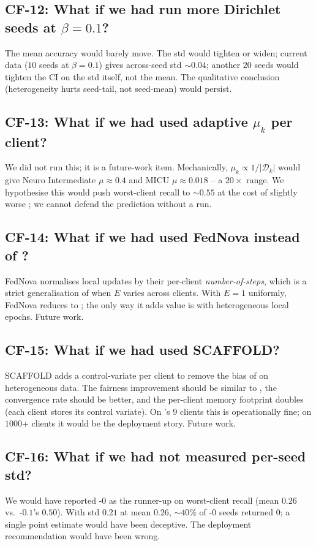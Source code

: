 \subsection{CF-12: What if we had run more Dirichlet seeds at $\beta=0.1$?}
The mean accuracy would barely move. The std would tighten or
widen; current data ($10$ seeds at $\beta\!=\!0.1$) gives across-seed
std $\sim$$0.04$; another $20$ seeds would tighten the CI on the std
itself, not the mean. The qualitative conclusion (heterogeneity
hurts seed-tail, not seed-mean) would persist.

\subsection{CF-13: What if we had used adaptive $\mu_k$ per client?}
We did not run this; it is a future-work item. Mechanically,
$\mu_k \!\propto\! 1/|\mathcal{D}_k|$ would give Neuro Intermediate
$\mu \!\approx\! 0.4$ and MICU $\mu \!\approx\! 0.018$ -- a $20\!\times$
range. We hypothesise this would push worst-client recall to
$\sim$$0.55$ at the cost of slightly worse \auroc{}; we cannot defend
the prediction without a run.

\subsection{CF-14: What if we had used FedNova instead of \fedprox{}?}
FedNova normalises local updates by their per-client
\emph{number-of-steps}, which is a strict generalisation of
\fedprox{} when $E$ varies across clients. With $E\!=\!1$ uniformly,
FedNova reduces to \fedavg{}; the only way it adds value is with
heterogeneous local epochs. Future work.

\subsection{CF-15: What if we had used SCAFFOLD?}
SCAFFOLD adds a control-variate per client to remove the bias of
\fedavg{} on heterogeneous data. The fairness improvement should be
similar to \fedprox{}, the convergence rate should be better, and
the per-client memory footprint doubles (each client stores its
control variate). On \mimic{}'s $9$ clients this is operationally
fine; on $1000$+ clients it would be the deployment story. Future
work.

\subsection{CF-16: What if we had not measured per-seed std?}
We would have reported \cvar{}-$0$ as the runner-up on worst-client
recall (mean $0.26$ vs.\ \fedprox{}-$0.1$'s $0.50$). With std
$0.21$ at mean $0.26$, $\sim$$40\%$ of \cvar{}-$0$ seeds returned $0$;
a single point estimate would have been deceptive. The
deployment recommendation would have been wrong.

